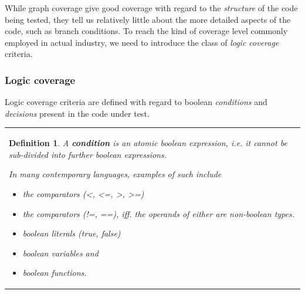 \documentclass{article}
\newcommand{\tmem}[1]{{\em #1\/}}
\newcommand{\tmtextbf}[1]{{\bfseries{#1}}}
\newenvironment{itemizedot}{\begin{itemize} \renewcommand{\labelitemi}{$\bullet$}\renewcommand{\labelitemii}{$\bullet$}\renewcommand{\labelitemiii}{$\bullet$}\renewcommand{\labelitemiv}{$\bullet$}}{\end{itemize}}
\newenvironment{tmparmod}[3]{\begin{list}{}{\setlength{\topsep}{0pt}\setlength{\leftmargin}{#1}\setlength{\rightmargin}{#2}\setlength{\parindent}{#3}\setlength{\listparindent}{\parindent}\setlength{\itemindent}{\parindent}\setlength{\parsep}{\parskip}} \item[]}{\end{list}}
\newtheorem{definition}{Definition}
{\theorembodyfont{\rmfamily}\newtheorem{example}{Example}}
\begin{document}
While graph coverage give good coverage with regard to the {\tmem{structure}}
of the code being tested, they tell us relatively little about the more
detailed aspects of the code, such as branch conditions. To reach the kind of
coverage level commonly employed in actual industry, we need to introduce the
class of {\tmem{logic coverage}} criteria.



\subsubsection{Logic coverage}

Logic coverage criteria are defined with regard to boolean {\tmem{conditions}}
and {\tmem{decisions}} present in the code under test.



\begin{tmparmod}{1cm}{0pt}{0pt}
  \begin{tmparmod}{0pt}{1cm}{0pt}
    {\noindent}{\noindent}\begin{tabular}{l}
      \begin{definition}
        
        
        
        
        A \tmtextbf{condition} is an atomic boolean expression, i.e. it cannot
        be sub-divided into further boolean expressions.
        
        
        
        In many contemporary languages, examples of such include
        \begin{itemizedot}
          \item the comparators (<, <=, >, >=)
          
          \item the comparators (!=, ==), iff. the operands of either are
          non-boolean types.
          
          \item boolean literals (true, false)
          
          \item boolean variables and
          
          \item boolean functions.
        \end{itemizedot}
      \end{definition}
    \end{tabular}{\hspace*{\fill}}{\smallskip}
  \end{tmparmod}
\end{tmparmod}
\end{document}
